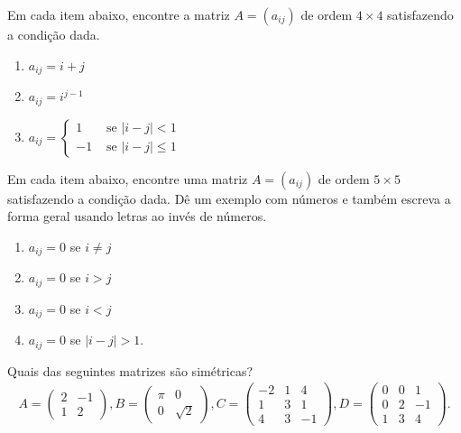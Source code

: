 \documentclass[12pt]{exam}
\begin{document}
    \vspace{.3cm}
    
    \questao{} Em cada item abaixo, encontre a matriz $A = (a_{ij})$ de ordem $4 \times 4$ satisfazendo a condição dada.
    \begin{enumerate}
        \item $a_{ij} = i + j$
        \item $a_{ij} = i^{j - 1}$
        \item $a_{ij} = \begin{cases}1 & \mbox{ se } |i - j| <1\\-1 & \mbox{ se } |i - j| \le 1\end{cases}$
    \end{enumerate}
    
    \vspace{.3cm}

    \questao{} Em cada item abaixo, encontre uma matriz $A = (a_{ij})$ de ordem $5 \times 5$ satisfazendo a condição dada. Dê um exemplo com números e também escreva a forma geral usando letras ao invés de números.
    \begin{enumerate}
        \item $a_{ij} = 0$ se $i \ne j$
        \item $a_{ij} = 0$ se $i > j$
        \item $a_{ij} = 0$ se $i < j$
        \item $a_{ij} = 0$ se $|i - j| > 1$.
    \end{enumerate}
    \vspace{.3cm}

    \questao{} Quais das seguintes matrizes são simétricas?
    \begin{align*}
        A = \begin{pmatrix}2 & -1\\1 & 2\end{pmatrix},
        B = \begin{pmatrix}\pi & 0\\0 & \sqrt{2}\end{pmatrix},
        C = \begin{pmatrix}-2 & 1 & 4\\1 & 3 & 1\\4 & 3 & -1\end{pmatrix},
        D = \begin{pmatrix}0 & 0 & 1\\0 & 2 & -1\\1 & 3 & 4\end{pmatrix}.
    \end{align*}
\end{document}
